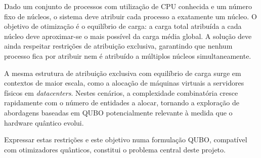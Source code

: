 Dado um conjunto de processos com utilização de \acs{CPU} conhecida e um número fixo de núcleos, o sistema deve atribuir cada processo a exatamente um núcleo. O objetivo de otimização é o equilíbrio de carga: a carga total atribuída a cada núcleo deve aproximar-se o mais possível da carga média global. A solução deve ainda respeitar restrições de atribuição exclusiva, garantindo que nenhum processo fica por atribuir nem é atribuído a múltiplos núcleos simultaneamente.

A mesma estrutura de atribuição exclusiva com equilíbrio de carga surge em contextos 
de maior escala, como a alocação de máquinas virtuais a servidores físicos em 
\emph{datacenters}. Nestes cenários, a complexidade combinatória cresce rapidamente 
com o número de entidades a alocar, tornando a exploração de abordagens baseadas 
em \acs{QUBO} potencialmente relevante à medida que o hardware quântico evolui.

Expressar estas restrições e este objetivo numa formulação \acs{QUBO}, compatível com otimizadores quânticos, constitui o problema central deste projeto.
